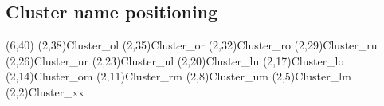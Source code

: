 \documentclass[a4paper,11pt]{article}
\begin{document}
\subsection{Cluster name positioning}

\begin{schema}(6,40)
\cluster*(2,38){Cluster\_ol}
\cluster*(2,35){Cluster\_or}
\cluster*(2,32){Cluster\_ro}
\cluster*(2,29){Cluster\_ru}
\cluster*(2,26){Cluster\_ur}
\cluster*(2,23){Cluster\_ul}
\cluster*(2,20){Cluster\_lu}
\cluster*(2,17){Cluster\_lo}
\cluster*(2,14){Cluster\_om}
\cluster*(2,11){Cluster\_rm}
\cluster*(2,8){Cluster\_um}
\cluster*(2,5){Cluster\_lm}
\cluster*(2,2){Cluster\_xx}
\end{schema}
\end{document}

